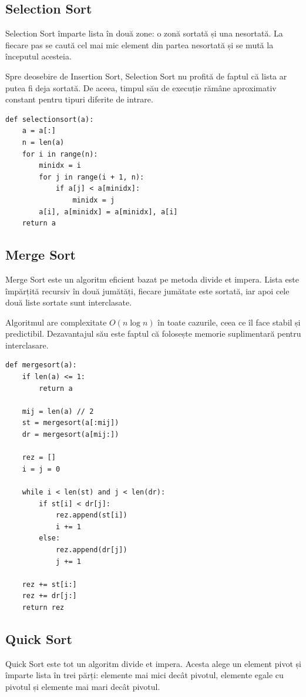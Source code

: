 \documentclass[a4paper,12pt]{article}
\begin{document}
\subsection{Selection Sort}
Selection Sort împarte lista în două zone: o zonă sortată și una nesortată. La fiecare pas se caută cel mai mic element din partea nesortată și se mută la începutul acesteia.

Spre deosebire de Insertion Sort, Selection Sort nu profită de faptul că lista ar putea fi deja sortată. De aceea, timpul său de execuție rămâne aproximativ constant pentru tipuri diferite de intrare.

\begin{lstlisting}[style=mypython, caption={Implementarea Selection Sort}]
def selectionsort(a):
    a = a[:]
    n = len(a)
    for i in range(n):
        minidx = i
        for j in range(i + 1, n):
            if a[j] < a[minidx]:
                minidx = j
        a[i], a[minidx] = a[minidx], a[i]
    return a
\end{lstlisting}

\subsection{Merge Sort}
Merge Sort este un algoritm eficient bazat pe metoda divide et impera. Lista este împărțită recursiv în două jumătăți, fiecare jumătate este sortată, iar apoi cele două liste sortate sunt interclasate.

Algoritmul are complexitate $O(n \log n)$ în toate cazurile, ceea ce îl face stabil și predictibil. Dezavantajul său este faptul că folosește memorie suplimentară pentru interclasare.

\begin{lstlisting}[style=mypython, caption={Implementarea Merge Sort}]
def mergesort(a):
    if len(a) <= 1:
        return a

    mij = len(a) // 2
    st = mergesort(a[:mij])
    dr = mergesort(a[mij:])

    rez = []
    i = j = 0

    while i < len(st) and j < len(dr):
        if st[i] < dr[j]:
            rez.append(st[i])
            i += 1
        else:
            rez.append(dr[j])
            j += 1

    rez += st[i:]
    rez += dr[j:]
    return rez
\end{lstlisting}

\subsection{Quick Sort}
Quick Sort este tot un algoritm divide et impera. Acesta alege un element pivot și împarte lista în trei părți: elemente mai mici decât pivotul, elemente egale cu pivotul și elemente mai mari decât pivotul.
\end{document}
